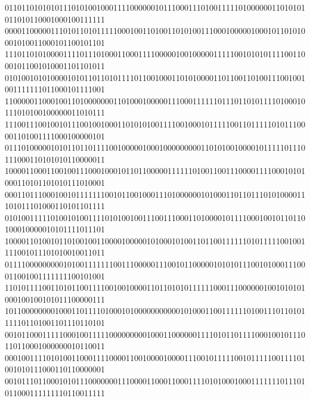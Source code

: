 \documentclass[10pt,\tflang,dvips]{book}
\begin{document}
{{\begin{minipage}{\oldpwidth}
{{{{011011010101011101010010001111000000101110001110100111110100000011010101011010110001000100111111\blue\\
000011000001110101101011111000100110100110101001110001000001000101101010001010011000101100101101\\
111011010100001111011101000110001111000001001000001111100101010111100110001011001010001101101011\blue\\
010100101010000101011011010111101100100011010100001101100110100111001001001111111011000101111001\\
110000011000100110100000001101000100000111000111111011101101011110100010111010100100000011010111\blue\\
111001110010010111001001000110101010011110010001011111001101111101011100001101001111000100000101\\
011101000001010110110111100100000100010000000001101010010000101111101110111000110101010110000011\blue\\
100001100011001001110001000101101100000111111010011001110000111100010101000110101101010111010001\\
000110111000100101111111001011001000111010000001010001101101110101000011101011101000110101101111\blue\\
010100111110100101001111010100100111001110001101000010111100010010110110100010000010101111011101\\
100001101001011010010011000010000010100010100110110011111101011111001001111001011101010010011011\blue\\
011110000000001010011111110011100000111001011000001010101110010100011100011001001111111100101001\\
110101111001101011001111001001000011011010101111110001110000001001010101000100100101011100000111\blue\\
101100000000100011011110100010100000000000101000110011111101001110110101111101101001101110110101\\
001011000111110001001111100000000010001100000011110101101111000100101110110110001000000010110011\blue\\
000100111101010011000111100001100100001000011100101111100101111100111101001010111000110110000001\\
001011101100010101110000000111000011000110001111010100010001111111011101011000111111110110011111\blue\\
}}}}
\end{minipage}}}
\end{document}
